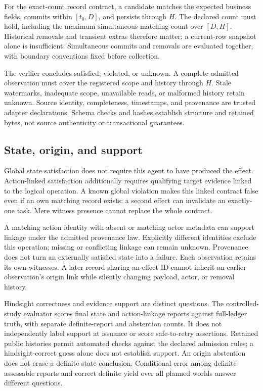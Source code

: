 \documentclass[conference]{IEEEtran}
\begin{document}
For the exact-count record contract, a candidate matches the expected business fields, commits within $[t_0,D]$, and persists through $H$. The declared count must hold, including the maximum simultaneous matching count over $[D,H]$. Historical removals and transient extras therefore matter; a current-row snapshot alone is insufficient. Simultaneous commits and removals are evaluated together, with boundary conventions fixed before collection.

The verifier concludes satisfied, violated, or unknown. A complete admitted observation must cover the registered scope and history through $H$. Stale watermarks, inadequate scope, unavailable reads, or malformed history retain unknown. Source identity, completeness, timestamps, and provenance are trusted adapter declarations. Schema checks and hashes establish structure and retained bytes, not source authenticity or transactional guarantees.

\subsection{State, origin, and support}

Global state satisfaction does not require this agent to have produced the effect. Action-linked satisfaction additionally requires qualifying target evidence linked to the logical operation. A known global violation makes this linked contract false even if an own matching record exists: a second effect can invalidate an exactly-one task. Mere witness presence cannot replace the whole contract.

A matching action identity with absent or matching actor metadata can support linkage under the admitted provenance law. Explicitly different identities exclude this operation; missing or conflicting linkage can remain unknown. Provenance does not turn an externally satisfied state into a failure. Each observation retains its own witnesses. A later record sharing an effect ID cannot inherit an earlier observation's origin link while silently changing payload, actor, or removal history.

Hindsight correctness and evidence support are distinct questions. The controlled-study evaluator scores final state and action-linkage reports against full-ledger truth, with separate definite-report and abstention counts. It does not independently label support at issuance or score safe-to-retry assertions. Retained public histories permit automated checks against the declared admission rules; a hindsight-correct guess alone does not establish support. An origin abstention does not erase a definite state conclusion. Conditional error among definite assessable reports and correct definite yield over all planned worlds answer different questions.
\end{document}
